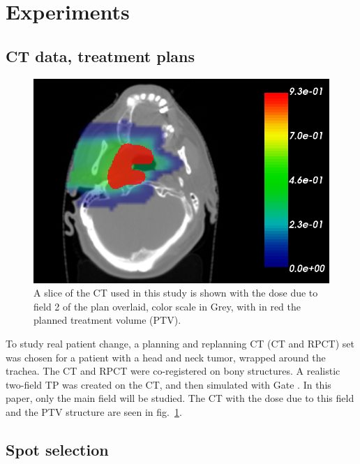 \documentclass[a4paper,english]{article}
\begin{document}
\section{Experiments}

\subsection{CT data, treatment plans}

\begin{figure}[htp]
  \centering
  \includegraphics[width=0.5\linewidth]{ourpatient}
  \caption{A slice of the CT used in this study is shown with the dose due to field 2 of the plan overlaid, color scale in Grey, with in red the planned treatment volume (PTV).}
  \label{fig:our-patient}
\end{figure}

To study real patient change, a planning and replanning CT (CT and RPCT) set was chosen for a patient with a head and neck tumor, wrapped around the trachea. The CT and RPCT were co-registered on bony structures. A realistic two-field TP was created on the CT, and then simulated with Gate \citep{Grevillot2012}. In this paper, only the main field will be studied. The CT with the dose due to this field and the PTV structure are seen in fig.~\ref{fig:our-patient}.

\subsection{Spot selection}
\end{document}
